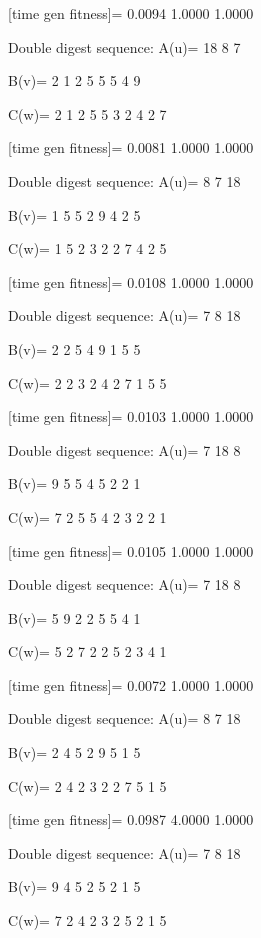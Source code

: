 [time gen fitness]=
    0.0094    1.0000    1.0000

Double digest sequence:
A(u)=
    18     8     7

B(v)=
     2     1     2     5     5     5     4     9

C(w)=
     2     1     2     5     5     3     2     4     2     7

[time gen fitness]=
    0.0081    1.0000    1.0000

Double digest sequence:
A(u)=
     8     7    18

B(v)=
     1     5     5     2     9     4     2     5

C(w)=
     1     5     2     3     2     2     7     4     2     5

[time gen fitness]=
    0.0108    1.0000    1.0000

Double digest sequence:
A(u)=
     7     8    18

B(v)=
     2     2     5     4     9     1     5     5

C(w)=
     2     2     3     2     4     2     7     1     5     5

[time gen fitness]=
    0.0103    1.0000    1.0000

Double digest sequence:
A(u)=
     7    18     8

B(v)=
     9     5     5     4     5     2     2     1

C(w)=
     7     2     5     5     4     2     3     2     2     1

[time gen fitness]=
    0.0105    1.0000    1.0000

Double digest sequence:
A(u)=
     7    18     8

B(v)=
     5     9     2     2     5     5     4     1

C(w)=
     5     2     7     2     2     5     2     3     4     1

[time gen fitness]=
    0.0072    1.0000    1.0000

Double digest sequence:
A(u)=
     8     7    18

B(v)=
     2     4     5     2     9     5     1     5

C(w)=
     2     4     2     3     2     2     7     5     1     5

[time gen fitness]=
    0.0987    4.0000    1.0000

Double digest sequence:
A(u)=
     7     8    18

B(v)=
     9     4     5     2     5     2     1     5

C(w)=
     7     2     4     2     3     2     5     2     1     5

